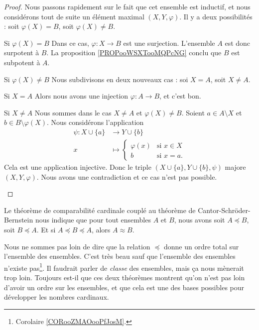 \begin{proof}
    Nous passons rapidement sur le fait que cet ensemble est inductif, et nous considérons tout de suite un élément maximal \( (X,Y,\varphi)\). Il y a deux possibilités : soit \( \varphi(X)=B\), soit \( \varphi(X)\neq B\).
    \begin{subproof}
        \item[Si \( \varphi(X)=B\)]
            Dans ce cas, \( \varphi\colon X\to B\) est une surjection. L'ensemble \( A\) est donc surpotent à \( B\). La proposition \ref{PROPooWSXTooMQPcNG} conclu que \( B\) est subpotent à \( A\).
        \item[Si \( \varphi(X)\neq B\)]
            Nous subdivisons en deux nouveaux cas : soi \( X=A\), soit \( X\neq A\).
            \begin{subproof}
                \item[Si \( X=A\)]
                    Alors nous avons une injection \( \varphi\colon A\to B\), et c'est bon.
                \item[Si \( X\neq A\)]
                    Nous sommes dans le cas \( X\neq A\) et \( \varphi(X)\neq B\). Soient \( a\in A\setminus X\) et \( b\in B\setminus \varphi(X)\). Nous considérons l'application
                    \begin{equation}
                        \begin{aligned}
                            \psi\colon X\cup\{ a \}&\to Y\cup\{ b \} \\
                            x&\mapsto \begin{cases}
                                \varphi(x)    &   \text{si } x\in X\\
                                b    &    \text{si }x=a.
                            \end{cases}
                        \end{aligned}
                    \end{equation}
                    Cela est une application injective. Donc le triple \( (X\cup \{ a \}, Y\cup\{ b \},\psi)\) majore \( (X,Y,\varphi)\). Nous avons une contradiction et ce cas n'est pas possible.
            \end{subproof}
    \end{subproof}
\end{proof}

\begin{normaltext}
    Le théorème de comparabilité cardinale couplé au théorème de Cantor-Schröder-Bernstein nous indique que pour tout ensembles \( A\) et \( B\), nous avons soit \( A\preceq B\), soit \( B\preceq A\). Et si \( A\preceq B\preceq A\), alors \( A\approx B\).

    Nous ne sommes pas loin de dire que la relation \( \preceq\) donne un ordre total sur l'ensemble des ensembles. C'est très beau sauf que l'ensemble des ensembles n'existe pas\footnote{Corolaire \ref{CORooZMAOooPfJosM}.}. Il faudrait parler de \emph{classe} des ensembles, mais ça nous mènerait trop loin. Toujours est-il que ces deux théorèmes montrent qu'on n'est pas loin d'avoir un ordre sur les ensembles, et que cela est une des bases possibles pour développer les nombres cardinaux.
\end{normaltext}

